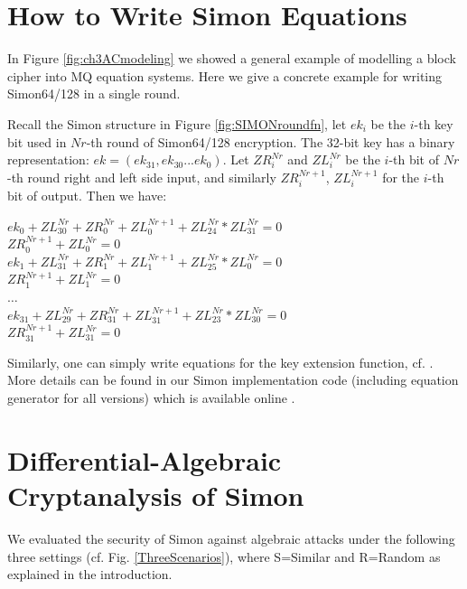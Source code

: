 \section{How to Write Simon Equations}
In Figure \ref{fig:ch3ACmodeling} we showed a general example of modelling a block cipher into MQ equation systems. Here we give a concrete example for writing Simon64/128 in a single round.

Recall the Simon structure in Figure \ref{fig:SIMONroundfn}, let $ek_i$ be the $i$-th key bit used in $Nr$-th round of Simon64/128 encryption. The 32-bit key has a binary representation: $ek=\left( ek_{31},ek_{30}...ek_{0}\right) $. Let $ZR^{Nr}_i$ and $ZL^{Nr}_i$ be the $i$-th bit of $Nr$-th round right and left side input, and similarly $ZR^{Nr+1}_i$, $ZL^{Nr+1}_i$ for the $i$-th bit of output. Then we have:

\begin{center}
$ek_0+ZL^{Nr}_{30} + ZR^{Nr}_0+ZL^{Nr+1}_0+ZL^{Nr}_{24}*ZL^{Nr}_{31} = 0$\\
$ZR^{Nr+1}_0+ZL^{Nr}_0 = 0$ \\
$ek_1+ZL^{Nr}_{31} + ZR^{Nr}_1+ZL^{Nr+1}_1+ZL^{Nr}_{25}*ZL^{Nr}_{0} = 0$\\
$ZR^{Nr+1}_1+ZL^{Nr}_1 = 0$ \\
$\dots$ \\
$ek_{31}+ZL^{Nr}_{29} + ZR^{Nr}_{31}+ZL^{Nr+1}_{31}+ZL^{Nr}_{23}*ZL^{Nr}_{30} = 0$\\
$ZR^{Nr+1}_{31}+ZL^{Nr}_{31} = 0$ 
\end{center}

Similarly, one can simply write equations for the key extension function, cf. \cite{NSAciphers}. More details can be found in our Simon implementation code (including equation generator for all versions) which is available online \cite{SongSimonSpeckGithub}.
\section{Differential-Algebraic Cryptanalysis of Simon}\label{Sec:DAcSimon}

We evaluated the security of Simon against algebraic attacks under the following
three settings (cf. Fig. \ref{ThreeScenarios}), where S=Similar and R=Random
as explained in the introduction.

